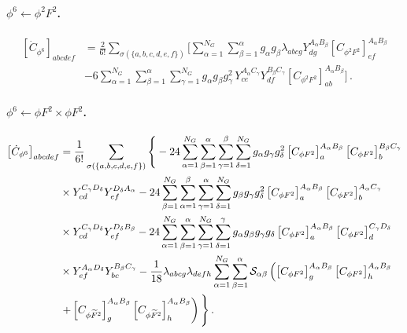 \paragraph{\texorpdfstring{$\phi^6 \leftarrow \phi^2 F^2$}{phi6fromphi2F2}.}
\label{par:phi6<-phi2F2}

\begin{align}
    \left[\dot C_{\phi^6}\right]_{abcdef} &=
    \frac{2}{6!}\sum_{\sigma(\{a,b,c,d,e,f\})} \Bigg[\sum_{\alpha=1}^{N_G} \sum_{\beta=1}^{\alpha} g_\alpha g_\beta \lambda_{abcg} Y_{dg}^{A_\alpha B_\beta} \left[C_{\phi^2 F^2}\right]_{ef}^{A_\alpha B_\beta}\nonumber\\
    &- 6 \sum_{\alpha=1}^{N_G}\sum_{\beta=1}^{\alpha}\sum_{\gamma=1}^{N_G} g_\alpha g_\beta g_\gamma^2 \,Y_{ce}^{A_\alpha C_\gamma} Y_{df}^{B_\beta C_\gamma} \left[C_{\phi^2 F^2}\right]_{ab}^{A_\alpha B_\beta}\Bigg]\,.
    \label{eq:phi6<-phi2F2}
\end{align}

\paragraph{\texorpdfstring{$\phi^6 \leftarrow \phi F^2 \times \phi F^2$}{phi6fromphiF2xphiF2}.}
\label{par:phi6<-phiF2xphiF2}

\begin{align}
    \left[\dot C_{\phi^6}\right]_{abcdef} &=
    \frac{1}{6!} 
    \sum_{\sigma(\{a,b,c,d,e,f\})}\Bigg\{
    -24\sum_{\alpha=1}^{N_G}\sum_{\beta=1}^{\alpha}
    \sum_{\gamma=1}^{\beta}\sum_{\delta=1}^{N_G} 
    g_\alpha g_\gamma g_\delta^2 \left[C_{\phi F^2}\right]_{a}^{A_\alpha B_\beta}
    \left[C_{\phi F^2}\right]_{b}^{B_\beta C_\gamma}\nonumber\\
    &\times Y_{cd}^{C_\gamma D_\delta}
    Y_{ef}^{D_\delta A_\alpha}-24 \sum_{\beta=1}^{N_G}\sum_{\alpha=1}^{\beta}
    \sum_{\gamma=1}^{\alpha}\sum_{\delta=1}^{N_G} g_\beta g_\gamma g_\delta^2 
    \left[C_{\phi F^2}\right]_{a}^{A_\alpha B_\beta} 
    \left[C_{\phi F^2}\right]_{b}^{A_\alpha C_\gamma}\nonumber \\
    &\times
    Y_{cd}^{C_\gamma D_\delta} Y_{ef}^{D_\delta B_\beta}-24
    \sum_{\alpha=1}^{N_G}\sum_{\beta=1}^{\alpha}
    \sum_{\gamma=1}^{N_G}\sum_{\delta=1}^{\gamma} 
    g_\alpha g_\beta g_\gamma g_\delta \left[C_{\phi F^2}\right]_{a}^{A_\alpha B_\beta} 
     \left[C_{\phi F^2}\right]_{d}^{C_\gamma D_\delta}\nonumber\\
    &\times
    Y_{ef}^{A_\alpha D_\delta}Y_{bc}^{B_\beta C_\gamma}-\frac{1}{18}\lambda_{abcg}\lambda_{defh}
    \sum_{\alpha=1}^{N_G}\sum_{\beta=1}^\alpha \mathcal{S}_{\alpha\beta}\left(
    \left[C_{\phi F^2}\right]_{g}^{A_\alpha B_\beta} 
    \left[C_{\phi F^2}\right]_{h}^{A_\alpha B_\beta}\right.
    \nonumber \\&\left.+\left[C_{\phi \widetilde{F}^2}\right]_{g}^{A_\alpha B_\beta} 
    \left[C_{\phi \widetilde{F}^2}\right]_{h}^{A_\alpha
    B_\beta}\right)\Bigg\}\,. 
\end{align}

